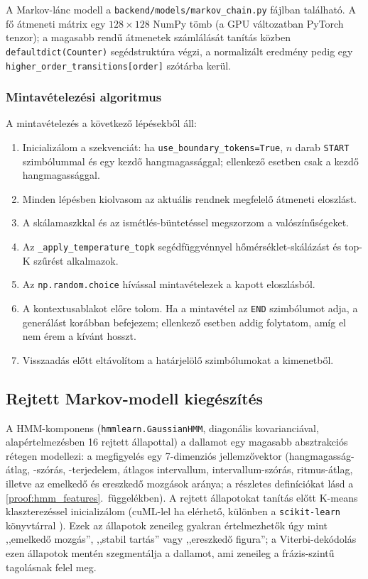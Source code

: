 A Markov-lánc modell a \texttt{backend/models/markov\_chain.py} fájlban található. A fő átmeneti mátrix egy $128 \times 128$ NumPy tömb (a GPU változatban PyTorch tenzor); a magasabb rendű átmenetek számlálását tanítás közben \texttt{defaultdict(Counter)} segédstruktúra végzi, a normalizált eredmény pedig egy \texttt{higher\_order\_transitions[order]} szótárba kerül.

\subsubsection{Mintavételezési algoritmus}

A mintavételezés a következő lépésekből áll:

\begin{enumerate}
\item Inicializálom a szekvenciát: ha \texttt{use\_boundary\_tokens=True}, $n$ darab \texttt{START} szimbólummal és egy kezdő hangmagassággal; ellenkező esetben csak a kezdő hangmagassággal.
\item Minden lépésben kiolvasom az aktuális rendnek megfelelő átmeneti eloszlást.
\item A skálamaszkkal és az ismétlés-büntetéssel megszorzom a valószínűségeket.
\item Az \texttt{\_apply\_temperature\_topk} segédfüggvénnyel hőmérséklet-skálázást és top-K szűrést alkalmazok.
\item Az \texttt{np.random.choice} hívással mintavételezek a kapott eloszlásból.
\item A kontextusablakot előre tolom. Ha a mintavétel az \texttt{END} szimbólumot adja, a generálást korábban befejezem; ellenkező esetben addig folytatom, amíg el nem érem a kívánt hosszt.
\item Visszaadás előtt eltávolítom a határjelölő szimbólumokat a kimenetből.
\end{enumerate}

\subsection{Rejtett Markov-modell kiegészítés}

A HMM-komponens (\texttt{hmmlearn.GaussianHMM}, diagonális kovarianciával, alapértelmezésben 16 rejtett állapottal) a dallamot egy magasabb absztrakciós rétegen modellezi: a megfigyelés egy 7-dimenziós jellemzővektor (hangmagasság-átlag, -szórás, -terjedelem, átlagos intervallum, intervallum-szórás, ritmus-átlag, illetve az emelkedő és ereszkedő mozgások aránya; a részletes definíciókat lásd a \ref{proof:hmm_features}.\ függelékben). A rejtett állapotokat tanítás előtt K-means klaszterezéssel inicializálom (cuML-lel ha elérhető, különben a \texttt{scikit-learn} könyvtárral \cite{pedregosa2011scikit}). Ezek az állapotok zeneileg gyakran értelmezhetők úgy mint ,,emelkedő mozgás'', ,,stabil tartás'' vagy ,,ereszkedő figura''; a Viterbi-dekódolás \cite{viterbi1967error} ezen állapotok mentén szegmentálja a dallamot, ami zeneileg a frázis-szintű tagolásnak felel meg.

